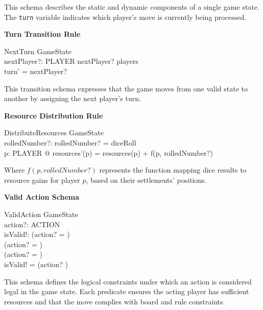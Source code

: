 \documentclass{article}
\begin{document}
This schema describes the static and dynamic components of a single game state.
The \texttt{turn} variable indicates which player's move is currently being processed. \newline

\textbf{Turn Transition Rule}

\begin{schema}{NextTurn}
    \Delta GameState \\
    nextPlayer?: PLAYER
    \where
    nextPlayer? \in players \\
    turn' = nextPlayer?
\end{schema}


This transition schema expresses that the game moves from one valid state to another by assigning the next player's turn. \newline

\textbf{Resource Distribution Rule}

\begin{schema}{DistributeResources}
    \Delta GameState \\
    rolledNumber?: 
    \where
    rolledNumber? = diceRoll \\
    \forall p: PLAYER @ resources'(p) = resources(p) + f(p, rolledNumber?)
\end{schema}


Where $f(p, rolledNumber?)$ represents the function mapping dice results to resource gains for player $p$, based on their settlements' positions. \newline

\textbf{Valid Action Schema}

\begin{schema}{ValidAction}
    GameState \\
    action?: ACTION \\
    isValid!: 
    \where
    (action? =  \implies {}) \\
    (action? =  \implies {}) \\
    (action? =  \implies {}) \\
    isValid! = (action? \in {})
\end{schema}


This schema defines the logical constraints under which an action is considered legal in the game state.
Each predicate ensures the acting player has sufficient resources and that the move complies with board and rule constraints.
\end{document}
